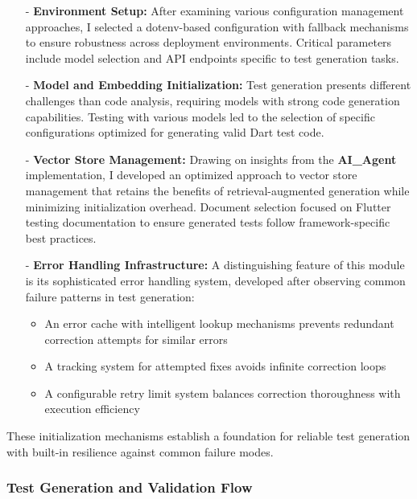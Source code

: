 \begin{itemize}
    \item[-] \textbf{Environment Setup:} After examining various configuration management approaches, I selected a dotenv-based configuration with fallback mechanisms to ensure robustness across deployment environments. Critical parameters include model selection and API endpoints specific to test generation tasks.

    \item[-] \textbf{Model and Embedding Initialization:} Test generation presents different challenges than code analysis, requiring models with strong code generation capabilities. Testing with various models led to the selection of specific configurations optimized for generating valid Dart test code.

    \item[-] \textbf{Vector Store Management:} Drawing on insights from the \textbf{AI\_Agent} implementation, I developed an optimized approach to vector store management that retains the benefits of retrieval-augmented generation while minimizing initialization overhead. Document selection focused on Flutter testing documentation to ensure generated tests follow framework-specific best practices.

    \item[-] \textbf{Error Handling Infrastructure:} A distinguishing feature of this module is its sophisticated error handling system, developed after observing common failure patterns in test generation:
    \begin{itemize}
        \item An error cache with intelligent lookup mechanisms prevents redundant correction attempts for similar errors
        \item A tracking system for attempted fixes avoids infinite correction loops
        \item A configurable retry limit system balances correction thoroughness with execution efficiency
    \end{itemize}
\end{itemize}

These initialization mechanisms establish a foundation for reliable test generation with built-in resilience against common failure modes.

\subsubsection{Test Generation and Validation Flow}


